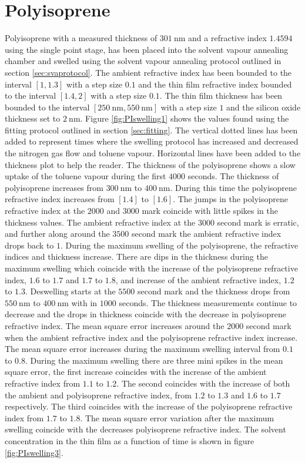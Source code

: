 \documentclass[MasterThesisMain.tex]{subfiles}
\begin{document}
\section{Polyisoprene}
Polyisoprene with a measured thickness of $\SI{301}{\nano\meter}$ and a refractive index $1.4594$ using the single point stage, has been placed into the solvent vapour annealing chamber and swelled using the solvent vapour annealing protocol outlined in section \ref{sec:svaprotocol}. The ambient refractive index has been bounded to the interval $[1,1.3]$ with a step size $0.1$ and the thin film refractive index bounded to the interval $[1.4,2]$ with a step size $0.1$. The thin film thickness has been bounded to the interval $[\SI{250}{\nano\meter},\SI{550}{\nano\meter}]$ with a step size $1$ and the silicon oxide thickness set to $\SI{2}{\nano\meter}$. Figure \ref{fig:PIswelling1} shows the values found using the fitting protocol outlined in section \ref{sec:fitting}. The vertical dotted lines has been added to represent times where the swelling protocol has increased and decreased the nitrogen gas flow and toluene vapour. Horizontal lines have been added to the thickness plot to help the reader. The thickness of the polyisoprene shows a slow uptake of the toluene vapour during the first $4000$ seconds. The thickness of polyisoprene increases from $\SI{300}{\nano\meter}$ to $\SI{400}{\nano\meter}$. During this time the polyisoprene refractive index increases from $[1.4]$ to $[1.6]$. The jumps in the polyisoprene refractive index at the $2000$ and $3000$ mark coincide with little spikes in the thickness values. The ambient refractive index at the $3000$ second mark is erratic, and further along around the $3500$ second mark the ambient refractive index drops back to $1$. During the maximum swelling of the polyisoprene, the refractive indices and thickness increase. There are dips in the thickness during the maximum swelling which coincide with the increase of the polyisoprene refractive index, $1.6$ to $1.7$ and $1.7$ to $1.8$, and increase of the ambient refractive index, $1.2$ to $1.3$. Deswelling starts at the $5500$ second mark and the thickness drops from $\SI{550}{\nano\meter}$ to $\SI{400}{\nano\meter}$ with in $1000$ seconds. The thickness measurements continue to decrease and the drops in thickness coincide with the decrease in polyisoprene refractive index. The mean square error increases around the $2000$ second mark when the ambient refractive index and the polyisoprene refractive index increase. The mean square error increases during the maximum swelling interval from $0.1$ to $0.8$. During the maximum swelling there are three mini spikes in the mean square error, the first increase coincides with the increase of the ambient refractive index from $1.1$ to $1.2$. The second coincides with the increase of both the ambient and polyisoprene refractive index, from $1.2$ to $1.3$ and $1.6$ to $1.7$ respectively. The third coincides with the increase of the polyisoprene refractive index from $1.7$ to $1.8$. The mean square error variation after the maximum swelling coincide with the decreases polyisoprene refractive index. The solvent concentration in the thin film as a function of time is shown in figure \ref{fig:PIswelling3}.
\end{document}

